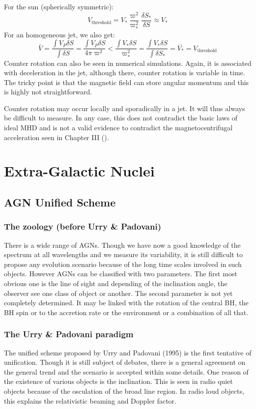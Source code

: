 \documentclass[10pt,a4paper,english]{article}
\begin{document}
For the sun (spherically symmetric):
\begin{equation}
  V_\mathrm{threshold} = V_* \frac{\varpi^2}{\varpi_*^2}\frac{\delta S_*}{\delta S} \approx V_*
\end{equation}
For an homogeneous jet, we also get:
\begin{equation}
  \bar{V} = \frac{\int V_P \delta S}{\int \delta S} = \frac{\int V_P \delta S}{4\pi\varpi^2} < \frac{\int V_* \delta S}{\varpi^2_*} = \frac{\int V_* \delta S}{\int \delta S_*} = \bar{V_*} = V_\mathrm{threshold}
\end{equation}
Counter rotation can also be seen in numerical simulations. Again, it is associated with deceleration in the jet, although there, counter rotation is variable in time. The tricky point is that the magnetic field can store angular momentum and this is highly not straightforward.

Counter rotation may occur locally and sporadically in a jet. It will thus always be difficult to measure. In any case, this does not contradict the basic laws of ideal MHD and is not a valid evidence to contradict the magnetocentrifugal acceleration seen in Chapter III ().
\section{Extra-Galactic Nuclei}
\subsection{AGN Unified Scheme}
\subsubsection{The zoology (before Urry \& Padovani)}
There is a wide range of AGNs. Though we have now a good knowledge of the spectrum at all wavelengths and we measure its variability, it is still difficult to propose any evolution scenario because of the long time scales involved in such objects. However AGNs can be classified with two parameters. The first most obvious one is the line of sight and depending of the inclination angle, the observer see one class of object or another. The second parameter is not yet completely determined. It may be linked with the rotation of the central BH, the BH spin or to the accretion rate or the environment or a combination of all that.

\subsubsection{The Urry \& Padovani paradigm}
The unified scheme proposed by Urry and Padovani (1995) is the first tentative of unification. Though it is still subject of debates, there is a general agreement on the general trend and the scenario is accepted within some details. One reason of the existence of various objects is the inclination. This is seen in radio quiet objects because of the osculation of the broad line region. In radio loud objects, this explains the relativistic beaming and Doppler factor.
\end{document}
